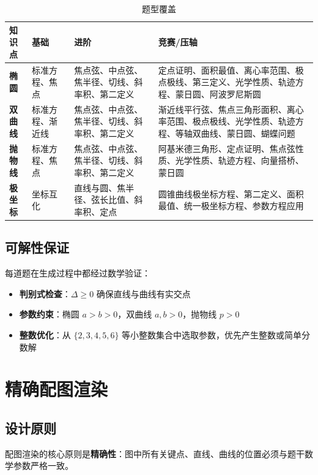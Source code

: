 \documentclass[11pt,a4paper]{article}
\begin{document}
\begin{table}[h]
\centering
\small
\begin{tabular}{p{1.5cm}p{3cm}p{4.5cm}p{5.5cm}}
\toprule
知识点 & 基础 & 进阶 & 竞赛/压轴 \\
\midrule
\textbf{椭圆} & 标准方程、焦点 & 焦点弦、中点弦、焦半径、切线、斜率积、第二定义 & 定点证明、面积最值、离心率范围、极点极线、第三定义、光学性质、轨迹方程、蒙日圆、阿波罗尼斯圆 \\
\textbf{双曲线} & 标准方程、渐近线 & 焦点弦、中点弦、焦半径、切线、斜率积、第二定义 & 渐近线平行弦、焦点三角形面积、离心率范围、极点极线、光学性质、轨迹方程、等轴双曲线、蒙日圆、蝴蝶问题 \\
\textbf{抛物线} & 标准方程、焦点 & 焦点弦、中点弦、焦半径、切线、斜率积、第二定义 & 阿基米德三角形、定点证明、焦点弦性质、光学性质、轨迹方程、向量搭桥、蒙日圆 \\
\textbf{极坐标} & 坐标互化 & 直线与圆、焦半径、弦长比值、斜率积、定点 & 圆锥曲线极坐标方程、第二定义、面积最值、统一极坐标方程、参数方程应用 \\
\bottomrule
\end{tabular}
\caption{题型覆盖}
\end{table}

\subsection{可解性保证}

每道题在生成过程中都经过数学验证：

\begin{itemize}
    \item \textbf{判别式检查}：$\Delta \geq 0$ 确保直线与曲线有实交点
    \item \textbf{参数约束}：椭圆 $a > b > 0$，双曲线 $a, b > 0$，抛物线 $p > 0$
    \item \textbf{整数优化}：从 $\{2, 3, 4, 5, 6\}$ 等小整数集合中选取参数，优先产生整数或简单分数解
\end{itemize}

\section{精确配图渲染}

\subsection{设计原则}

配图渲染的核心原则是\textbf{精确性}：图中所有关键点、直线、曲线的位置必须与题干数学参数严格一致。
\end{document}

